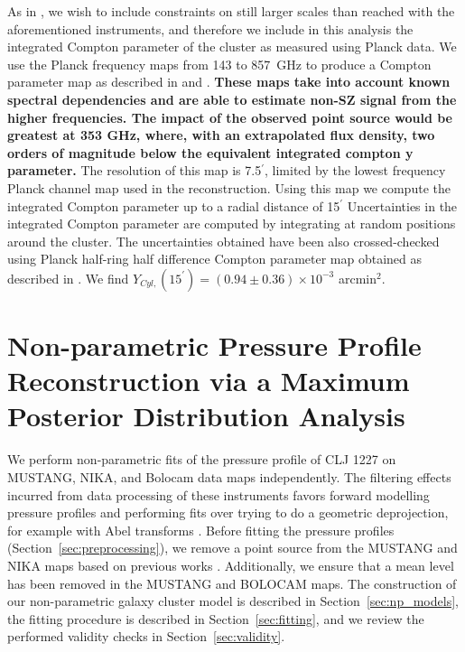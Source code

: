 \documentclass[twocolumn,traditabstract]{aa}
\begin{document}
As in \citet{adam2015}, we wish to include constraints on still larger scales than reached with the aforementioned instruments,
and therefore we include in this analysis the integrated Compton parameter of the cluster as measured using Planck data.
We use the Planck frequency maps from 143 to 857~GHz to produce a Compton parameter map as described in \citet{hurier2013} and
\citet{planck2013ymap,planck2016_tsz}. \textbf{These maps take into account known spectral dependencies and are able to estimate non-SZ
  signal from the higher frequencies. The impact of the observed point source would be greatest at 353 GHz, where, with an extrapolated
  flux density, 
  two orders of magnitude below the equivalent integrated compton y parameter.}
The resolution of this map is 7.5$^{\prime}$, limited by the lowest frequency Planck channel
map used in the reconstruction. Using this map we compute the integrated Compton parameter up to a radial distance of 15$^{\prime}$
Uncertainties in the integrated Compton parameter are computed by integrating at random positions
around the cluster. The uncertainties obtained have been also crossed-checked using Planck half-ring half difference Compton parameter
map
obtained as described in \citet{planck2013ymap,planck2016_tsz}. We find $Y_{Cyl,}(15^{\prime}) = (0.94 \pm 0.36) \times 10^{-3}$ arcmin$^2$. 


\section{Non-parametric Pressure Profile Reconstruction via a Maximum Posterior Distribution Analysis}
\label{sec:ml_deproj}


We perform non-parametric fits of the pressure profile of CLJ 1227 on MUSTANG, NIKA, and Bolocam data maps independently.
The filtering effects incurred from data processing of these instruments favors forward modelling pressure profiles and
performing fits over trying to do a geometric deprojection, for example with Abel transforms \citep[e.g.][]{basu2010}.
Before fitting the pressure profiles (Section~\ref{sec:preprocessing}),
we remove a point source from the MUSTANG and NIKA maps based on previous works
\citep{adam2015,romero2017}. Additionally, we ensure that a mean level has been removed in the MUSTANG and BOLOCAM maps. 
The construction of our non-parametric galaxy cluster model is described in Section~\ref{sec:np_models}, the fitting
procedure is described in Section~\ref{sec:fitting}, and we review the performed validity checks in Section~\ref{sec:validity}.
\end{document}
